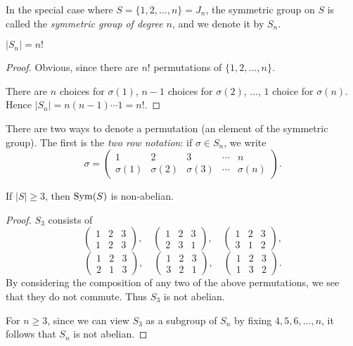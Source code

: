 In the special case where $S=\{1,2,\dots,n\}=J_n$, the symmetric group on $S$ is called the \emph{symmetric group of degree $n$}, and we denote it by $S_n$.

\begin{lemma}
$|S_n|=n!$
\end{lemma}

\begin{proof}
Obvious, since there are $n!$ permutations of $\{1,2,\dots,n\}$.

There are $n$ choices for $\sigma(1)$, $n-1$ choices for $\sigma(2)$, ..., $1$ choice for $\sigma(n)$. Hence $|S_n|=n(n-1)\cdots1=n!$.
\end{proof}

There are two ways to denote a permutation (an element of the symmetric group). The first is the \emph{two row notation}: if $\sigma\in S_n$, we write
\[\sigma=\begin{pmatrix}
1&2&3&\cdots&n\\
\sigma(1)&\sigma(2)&\sigma(3)&\cdots&\sigma(n)
\end{pmatrix}.\]

\begin{lemma}
If $|S|\ge3$, then $\operatorname{Sym}(S)$ is non-abelian.
\end{lemma}

\begin{proof}
$S_3$ consists of
\[\begin{pmatrix}
1&2&3\\
1&2&3
\end{pmatrix},\quad
\begin{pmatrix}
1&2&3\\
2&3&1
\end{pmatrix},\quad
\begin{pmatrix}
1&2&3\\
3&1&2
\end{pmatrix},
\]
\[
\begin{pmatrix}
1&2&3\\
2&1&3
\end{pmatrix},\quad
\begin{pmatrix}
1&2&3\\
3&2&1
\end{pmatrix},\quad
\begin{pmatrix}
1&2&3\\
1&3&2
\end{pmatrix}.
\]
By considering the composition of any two of the above permutations, we see that they do not commute. Thus $S_3$ is not abelian. 

For $n\ge3$, since we can view $S_3$ as a subgroup of $S_n$ by fixing $4,5,6,\dots,n$, it follows that $S_n$ is not abelian.
\end{proof}

